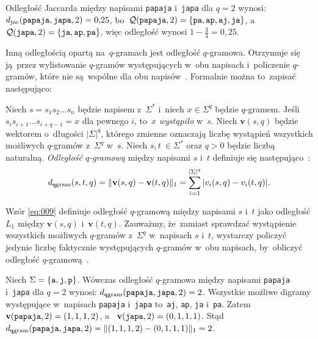 \documentclass{praca1}
\DeclarePairedDelimiter{\norm}{\lVert}{\rVert}
\begin{document}
\begin{example}
Odległość Jaccarda między napisami \verb|papaja| i~\verb|japa| dla $q = 2$ wynosi: $d_{\mathrm{jac}}(\verb|papaja|, \verb|japa|, 2)  = 0{,}25$, bo~$\mathcal{Q}(\verb|papaja|, 2) = \{\verb|pa|, \verb|ap|, \verb|aj|, \verb|ja|\}$, a~$\mathcal{Q}(\verb|japa|, 2) = \{\verb|ja|, \verb|ap|, \verb|pa|\}$, więc odległość wynosi $1 - \frac{3}{4} = 0{,}25$.
\end{example}


Inną odległością opartą na~$q$-gramach jest odległość $q$-gramowa. Otrzymuje się ją~przez wylistowanie $q$-gramów występujących w~obu napisach i~policzenie $q$-gramów, które nie są~wspólne dla obu napisów~\cite{Loo2014:stringdist}. Formalnie można to~zapisać następująco:

\begin{definition}
Niech $s = s_1 s_2 \ldots s_n$ będzie napisem z~$\Sigma^*$ i~niech $x \in \Sigma^q$ będzie $q$-gramem. Jeśli $s_i s_{i+1} \ldots s_{i+q-1} = x$ dla pewnego $i$, to~$x$ \emph{wystąpiło} w~$s$. Niech $\mathbf{v}(s,q)$ będzie wektorem o~długości $|\Sigma|^q$, którego zmienne oznaczają liczbę wystąpień wszystkich możliwych $q$-gramów z~$\Sigma^q$ w~$s$. Niech $s, t~\in \Sigma^*$ oraz $q>0$ będzie liczbą naturalną. \emph{Odległość $q$-gramową} między napisami $s$ i~$t$ definiuje się następująco~\cite{Ukkonen1992:approxqgrams}:
\begin{equation}
\label{eq:009}
d_{\mathtt{q}\mathrm{gram}}(s,t,q) = \norm{\mathbf{v}(s,q) - \mathbf{v}(t,q)}_1 = \sum\limits_{i = 1}^{|\Sigma|^q} |v_i(s,q) - v_i(t,q)|.
\end{equation}
\end{definition} 

Wzór \eqref{eq:009} definiuje odległość $q$-gramową między napisami $s$ i~$t$ jako odległość $L_1$ między $\mathbf{v}(s,q)$ i~$\mathbf{v}(t,q)$. Zauważmy, że~zamiast sprawdzać wystąpienie wszystkich możliwych $q$-gramów z~$\Sigma^q$ w~napisach $s$ i~$t$, wystarczy policzyć jedynie liczbę faktycznie występujących $q$-gramów w~obu napisach, by~obliczyć odległość $q$-gramową~\cite{Loo2014:stringdist}.

\begin{example}
\label{ex:001}
Niech $\Sigma = \{\verb|a|, \verb|j|, \verb|p|\}$. Wówczas odległość $q$-gramowa między napisami \verb|papaja| i~\verb|japa| dla $q = 2$ wynosi: $d_{\mathtt{q}\mathrm{gram}}(\verb|papaja|, \verb|japa|, 2) = 2$. Wszystkie możliwe digramy występujące w~napisach  \verb|papaja| i~\verb|japa| to~\verb|aj|, \verb|ap|, \verb|ja| i~\verb|pa|. Zatem $\mathbf{v}( \verb|papaja|,2) = (1, 1, 1, 2)$, a~ $\mathbf{v}( \verb|japa|,2) = (0, 1, 1, 1)$. Stąd $d_{\mathtt{q}\mathrm{gram}}(\verb|papaja|, \verb|japa|, 2) =  \norm{(1,1,1,2) - (0,1,1,1)}_1 = 2$.
\end{example}
\end{document}
